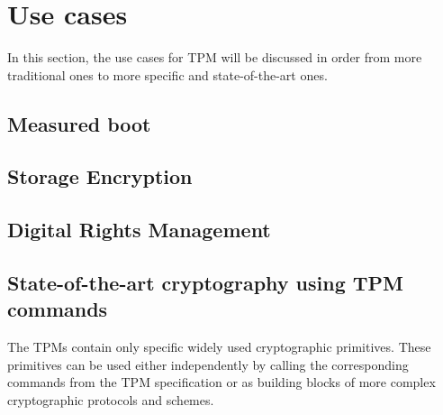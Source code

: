 \section{Use cases}
In this section, the use cases for TPM will be discussed in order from more traditional ones to more specific and state-of-the-art ones.

\subsection{Measured boot}

\subsection{Storage Encryption}

\subsection{Digital Rights Management}

\subsection{State-of-the-art cryptography using TPM commands}
The TPMs contain only specific widely used cryptographic primitives. These primitives can be used either independently by calling the corresponding commands from the TPM specification or as building blocks of more complex cryptographic protocols and schemes. 

